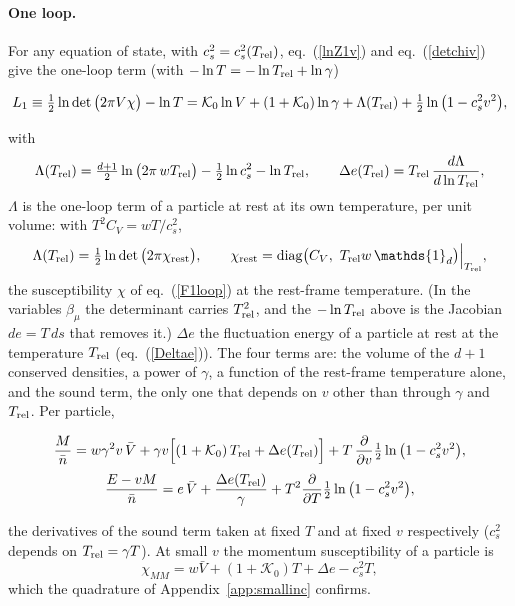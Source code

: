 \documentclass[11pt,aps,preprint,nofootinbib,superscriptaddress,tightenlines]{revtex4-2}
\newcommand{\one}{\mathds{1}}
\def\st{\begin{equation}}
\def\stp{\end{equation}}
\def\Eq#1{eq.~(\ref{#1})}
\def\App#1{Appendix~\ref{#1}}
\let\oldparagraph\paragraph
\renewcommand{\paragraph}{\par\bigskip\oldparagraph}
\begin{document}
\paragraph{One loop.}  For any equation of state, with $c_s^2=c_s^2(T_{\rm rel})$, \Eq{lnZ1v} and \Eq{detchiv} give the one-loop term (with $-\ln T=-\ln T_{\rm rel}+\ln\gamma$)
\begin{keyeq}
\st
L_1\equiv\tfrac12\ln\det\big(2\pi V\chi\big)-\ln T=\mathcal K_0\ln V+(1+\mathcal K_0)\ln\gamma+\Lambda(T_{\rm rel})+\tfrac12\ln\big(1-c_s^2v^2\big),
\label{L1}
\stp
\end{keyeq}
with
\st
\Lambda(T_{\rm rel})=\tfrac{d+1}2\ln\big(2\pi\,wT_{\rm rel}\big)-\tfrac12\ln c_s^2-\ln T_{\rm rel},\qquad \Delta e(T_{\rm rel})=T_{\rm rel}\,\frac{d\Lambda}{d\ln T_{\rm rel}} ,
\stp
$\Lambda$ is the one-loop term of a particle at rest at its own temperature, per unit volume: with $T^2C_V=wT/c_s^2$,
\st
\Lambda(T_{\rm rel})=\tfrac12\ln\det\big(2\pi\chi_{\rm rest}\big),\qquad \chi_{\rm rest}={\rm diag}\big(C_V,\ T_{\rm rel}w\,\one_d\big)\Big|_{T_{\rm rel}} ,
\label{Lambdachi}
\stp
the susceptibility $\chi$ of \Eq{F1loop} at the rest-frame temperature.  (In the variables $\beta_\mu$ the determinant carries $T_{\rm rel}^2$, and the $-\ln T_{\rm rel}$
above is the Jacobian $de=T\,ds$ that removes it.)  $\Delta e$ the fluctuation energy of a particle at rest at the temperature $T_{\rm rel}$ (\Eq{Deltae}).  The four terms are: the volume of the $d+1$ conserved densities, a power
of $\gamma$, a function of the rest-frame temperature alone, and the sound term, the only one that depends on $v$ other than through $\gamma$ and $T_{\rm rel}$.  Per particle,
\begin{keyeq}
\st
\frac{M}{\bar n}=w\gamma^2v\,\bar V+\gamma v\Big[(1+\mathcal K_0)\,T_{\rm rel}+\Delta e(T_{\rm rel})\Big]+T\,\frac{\partial}{\partial v}\tfrac12\ln\big(1-c_s^2v^2\big),
\label{momentum1}
\stp
\st
\frac{E-vM}{\bar n}=e\,\bar V+\frac{\Delta e(T_{\rm rel})}\gamma+T^2\frac{\partial}{\partial T}\tfrac12\ln\big(1-c_s^2v^2\big),
\stp
\end{keyeq}
the derivatives of the sound term taken at fixed $T$ and at fixed $v$ respectively ($c_s^2$ depends on $T_{\rm rel}=\gamma T$).  At small $v$ the momentum susceptibility of a
particle is
\st
\chi_{MM}=w\bar V+(1+\mathcal K_0)T+\Delta e-c_s^2T ,
\stp
which the quadrature of \App{app:smallinc} confirms.
\end{document}
